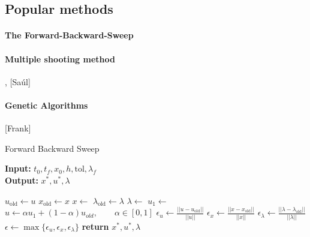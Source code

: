\subsection{Popular methods}
\paragraph{The Forward-Backward-Sweep}
	\cite{hackbusch1978numerical}
\paragraph{Multiple shooting method}
	\cite*{Pesch1989} , [Saúl]
\paragraph{Genetic Algorithms}
	[Frank]
\begin{algorithm}
	\caption{Forward Backward Sweep } \label{alg:forward_backward_sweep}
    \begin{flushleft}
    	\hspace*{\algorithmicindent} \textbf{Input:} 
    	$t_0, t_f, x_0,h, \text{tol}, \lambda_{f}$ \\
    	\hspace*{\algorithmicindent} \textbf{Output:} 
   		$x^*, u^*, \lambda$
   	\end{flushleft}
	\begin{algorithmic}
				\State $u_{\text{old}} \gets u$ 
                \State $x_{\text{old}} \gets x$ 
                \State $ x \gets$
                \State $\lambda_{\text{old}} \gets \lambda $
				\State $\lambda \gets$ 
                \State $u_1 \gets$ 
                \State 
                	$u \gets \alpha u_1 + (1-\alpha)u_{old}, 
                	\qquad \alpha \in [0, 1]$
                \State 
                	$\epsilon_u \gets \displaystyle 
                	\frac{||u - u_{\text{old}}||}{||u||}$
                \State 
                	$\epsilon_x \gets \displaystyle 
                	\frac{||x - x_{\text{old}}||}{||x||}$
                \State 
                	$\epsilon_{\lambda} \gets \displaystyle 
                	\frac{||\lambda - \lambda_{\text{old}}||}{||\lambda||}$
                \State 
                	$\epsilon \gets 
                		\max{ 
                			\{ \epsilon_u, \epsilon_x, \epsilon_{\lambda} \}
                		}$
      \EndWhile\label{}
        \State \textbf{return} $ x^*, u^*, \lambda$
		\EndProcedure
	\end{algorithmic}
\end{algorithm}
